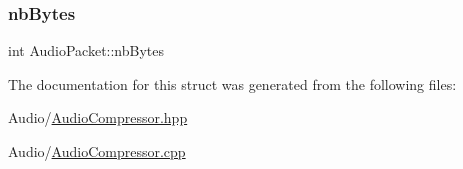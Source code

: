 \mbox{\label{structAudioPacket_a95c971a83513ac461f834e9caeb2fd2b}} 
\subsubsection{\texorpdfstring{nb\+Bytes}{nbBytes}}
{\footnotesize\ttfamily int Audio\+Packet\+::nb\+Bytes}



The documentation for this struct was generated from the following files\+:\begin{DoxyCompactItemize}
\item 
Audio/\mbox{\hyperlink{AudioCompressor_8hpp}{Audio\+Compressor.\+hpp}}\item 
Audio/\mbox{\hyperlink{AudioCompressor_8cpp}{Audio\+Compressor.\+cpp}}\end{DoxyCompactItemize}
